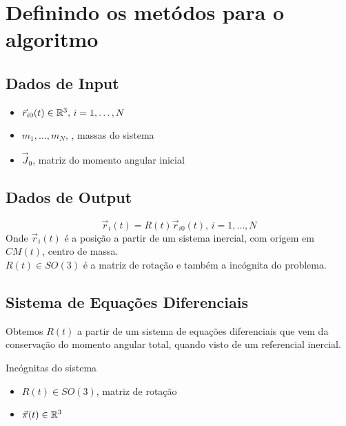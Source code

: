 %
\chapter{Definindo os metódos para o algoritmo}
\label{sec:metodos}
\section{Dados de Input}

\begin{itemize}
    \item \( \vec{r}_{i0}(t) \in \mathbb{R}^3, \, i = 1, \dots, N \)
    \item \(m_1, \dots, m_N, \, \), massas do sistema
    \item \(\vec{J}_0\), matriz do momento angular inicial
\end{itemize}

\section{Dados de Output}
\[\vec{r}_i(t) = R(t)\vec{r}_{i0}(t), \,  i = 1, \dots, N\]
Onde \(\vec{r}_i(t) \) é a posição a partir de um sistema inercial, com origem em \(CM(t)\), centro de massa.\\
\(R(t) \in SO(3)\) é a matriz de rotação e também a incógnita do problema. 

\section{Sistema de Equações Diferenciais}
Obtemos \(R(t)\) a partir de um sistema de equações diferenciais que vem da conservação do momento angular total, quando visto de um referencial inercial.\\

\begin{Large}
Incógnitas do sistema
\end{Large}
\begin{itemize}
\item \(R(t) \in SO(3)\), matriz de rotação
\item \(\vec{\pi}(t) \in \mathbb{R}^3\)
\end{itemize}

